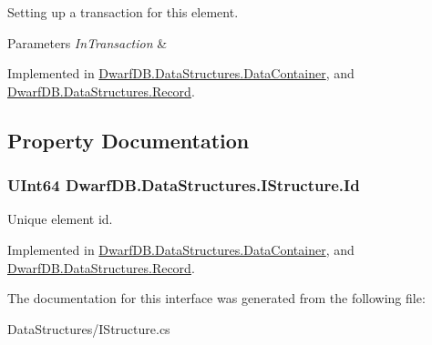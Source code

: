 Setting up a transaction for this element. 


\begin{DoxyParams}{Parameters}
{\em InTransaction} & \\
\hline
\end{DoxyParams}


Implemented in \hyperlink{class_dwarf_d_b_1_1_data_structures_1_1_data_container_a40b2dc31b54b0d41b29e58ea5ea4a3fb}{DwarfDB.DataStructures.DataContainer}, and \hyperlink{class_dwarf_d_b_1_1_data_structures_1_1_record_a4997c638afaaa5b8f281a492b639dfca}{DwarfDB.DataStructures.Record}.



\subsection{Property Documentation}
\hypertarget{interface_dwarf_d_b_1_1_data_structures_1_1_i_structure_a9fab102fba11f70ab46272b53201784d}{
\subsubsection[{Id}]{\setlength{\rightskip}{0pt plus 5cm}UInt64 DwarfDB.DataStructures.IStructure.Id}}
\label{interface_dwarf_d_b_1_1_data_structures_1_1_i_structure_a9fab102fba11f70ab46272b53201784d}


Unique element id. 



Implemented in \hyperlink{class_dwarf_d_b_1_1_data_structures_1_1_data_container_a3e5849e957860912c9050dbd84818dfd}{DwarfDB.DataStructures.DataContainer}, and \hyperlink{class_dwarf_d_b_1_1_data_structures_1_1_record_a6b33388f9fa7edcea1e29890da207be4}{DwarfDB.DataStructures.Record}.



The documentation for this interface was generated from the following file:\begin{DoxyCompactItemize}
\item 
DataStructures/IStructure.cs\end{DoxyCompactItemize}
